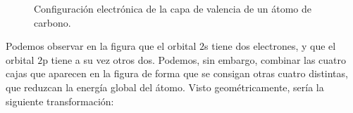 \documentclass[twoside,a4paper,justified,12pt]{tufte-handout}
\begin{document}
\begin{figure}
    \centering
    \caption{Configuración electrónica de la capa de valencia de un átomo de carbono.}
    \label{fig:carbono_cajas}
\end{figure}

Podemos observar en la figura que el orbital $2$s tiene dos electrones, y que el orbital $2$p tiene a su vez otros dos. Podemos, sin embargo, combinar las cuatro cajas que aparecen en la figura de forma que se consigan otras cuatro distintas, que reduzcan la energía global del átomo. Visto geométricamente, sería la siguiente transformación:
\end{document}
